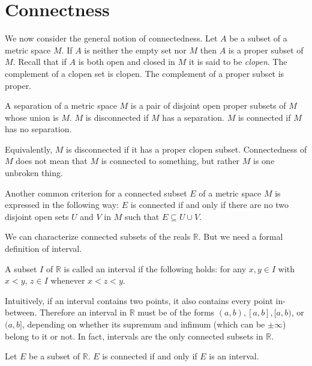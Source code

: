 \section{Connectness}
\label{sec:conn}

We now consider the general notion of connectedness.
Let $A$ be a subset of a metric space $M$.
If $A$ is neither the empty set nor $M$ then $A$ is a \textsf{proper} subset of $M$.
Recall that if $A$ is both open and closed in $M$ it is said to be \textit{clopen}.
The complement of a clopen set is clopen.
The complement of a proper subset is proper.

\begin{defn}
  A \textsf{separation} of a metric space $M$ is a pair of disjoint open proper subsets of $M$ whose union is $M$.
  $M$ is \textsf{disconnected} if $M$ has a separation.
  $M$ is \textsf{connected} if $M$ has no separation.
\end{defn}

Equivalently, $M$ is disconnected if it has a proper clopen subset.
Connectedness of $M$ does not mean that $M$ is connected to something, but rather $M$ is one unbroken thing.

Another common criterion for a connected subset $E$ of a metric space $M$ is expressed in the following way: $E$ is connected if and only if there are no two disjoint open sets $U$ and $V$ in $M$ such that $E \subseteq U \cup V$.

We can characterize connected subsets of the reals $\mathbb{R}$.
But we need a formal definition of interval.

\begin{defn}
  A subset $I$ of $\mathbb{R}$ is called an \textsf{interval} if the following holds: for any $x, y \in I$ with $x < y$, $z \in I$ whenever $x < z < y$.
\end{defn}

Intuitively, if an interval contains two points, it also contains every point in-between.
Therefore an interval in $\mathbb{R}$ must be of the forms $(a,b), [a,b], [a,b)$, or $(a,b]$, depending on whether its supremum and infimum (which can be $\pm\infty$) belong to it or not.
In fact, intervals are the only connected subsets in $\mathbb{R}$.

\begin{thm}
  \label{thm:conn-R-interval}
  Let $E$ be a subset of $\mathbb{R}$.
  $E$ is connected if and only if $E$ is an interval.
\end{thm}

